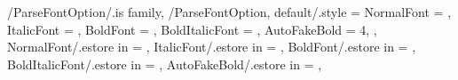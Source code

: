 \newcommand{\SetCustomEngFontFiles}[4]
{%
  \SetFontUseType{\VarFontTypeCustom}
  \renewcommand{\VarFontTypeCustomEngFileNameNormal}{#1}%
  \renewcommand{\VarFontTypeCustomEngFileNameItalic}{#2}%
  \renewcommand{\VarFontTypeCustomEngFileNameBold}{#3}%
  \renewcommand{\VarFontTypeCustomEngFileNameBoldItalic}{#4}%
} %

\newcommand{\SetCustomChiFontFiles}[4]
{%
  \SetFontUseType{\VarFontTypeCustom}
  \renewcommand{\VarFontTypeCustomChiFileNameNormal}{#1}%
  \renewcommand{\VarFontTypeCustomChiFileNameItalic}{#2}%
  \renewcommand{\VarFontTypeCustomChiFileNameBold}{#3}%
  \renewcommand{\VarFontTypeCustomChiFileNameBoldItalic}{#4}%
} %
\newcommand{\VarFontTypeCustom}{10}


\def \VarFontDirPath {./ncku/fonts/} %
\def \GetFontDirPath {\VarFontDirPath}

\newcommand{\VarFontUseType}{\VarFontTypeTimesKaiu} %
\newcommand{\GetFontUseType}{\VarFontUseType}
\newcommand{\SetFontUseType}[1]
{%
  \renewcommand{\VarFontUseType}{#1}%
} %


\pgfkeys
{
  /ParseFontOption/.is family, /ParseFontOption,
  default/.style =
  {
    NormalFont = \empty,
    ItalicFont = \empty,
    BoldFont = \empty,
    BoldItalicFont = \empty,
    AutoFakeBold = 4,
  },
  NormalFont/.estore in = \TmpValueNormalFont,
  ItalicFont/.estore in = \TmpValueItalicFont,
  BoldFont/.estore in = \TmpValueBoldFont,
  BoldItalicFont/.estore in = \TmpValueBoldItalicFont,
  AutoFakeBold/.estore in = \TmpValueAutoFakeBold,
} %

\newcommand{\SetEngMainFont}[2][\empty]
{%
  \pgfkeys{/ParseFontOption, default, #1}%
  \defaultfontfeatures[#2]{%
    Path = \GetFontDirPath,
    UprightFont = \TmpValueNormalFont
  }%
  \ifthenelse{\equal{\TmpValueItalicFont}{\empty}}{}{%
    \defaultfontfeatures+[#2]{%
      ItalicFont = \TmpValueItalicFont}}%
  \ifthenelse{\equal{\TmpValueBoldFont}{\empty}}{}{%
    \defaultfontfeatures+[#2]{%
      BoldFont = \TmpValueBoldFont}}%
  \ifthenelse{\equal{\TmpValueBoldItalicFont}{\empty}}{}{%
    \defaultfontfeatures+[#2]{%
      BoldItalicFont = \TmpValueBoldItalicFont}}%
  \setmainfont{#2}
} %

